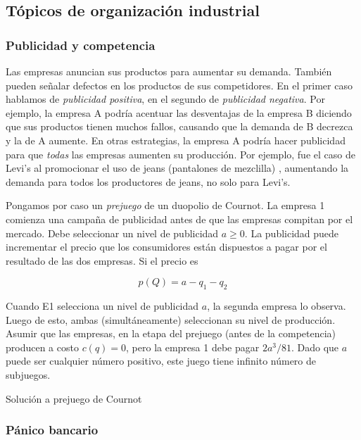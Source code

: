 \documentclass[12pt]{scrartcl}
\begin{document}
\subsection{Tópicos de organización industrial}

\subsubsection{Publicidad y competencia}

Las empresas anuncian sus productos para aumentar su demanda. También pueden señalar defectos en los productos de sus competidores. En el primer caso hablamos de \textit{publicidad positiva}, en el segundo de \textit{publicidad negativa}. Por ejemplo, la empresa A podría acentuar las desventajas de la empresa B diciendo que sus productos tienen muchos fallos, causando que la demanda de B decrezca y la de A aumente. En otras estrategias, la empresa A podría hacer publicidad para que \textit{todas} las empresas aumenten su producción. Por ejemplo, fue el caso de Levi's al promocionar el uso de jeans (pantalones de mezclilla) , aumentando la demanda para todos los productores de jeans, no solo para Levi's. 

Pongamos por caso un \textit{prejuego} de un duopolio de Cournot. La empresa 1 comienza una campaña de publicidad antes de que las empresas compitan por el mercado. Debe seleccionar un nivel de publicidad $a\geq 0$. La publicidad puede incrementar el precio que los consumidores están dispuestos a pagar por el resultado de las dos empresas. Si el precio es

\[ p(Q) = a - q_1 - q_2 \]

Cuando E1 selecciona un nivel de publicidad $a$, la segunda empresa lo observa. Luego de esto, ambas (simultáneamente) seleccionan su nivel de producción. Asumir que las empresas, en la etapa del prejuego (antes de la competencia) producen a costo $c(q) = 0$, pero la empresa 1 debe pagar $2a^3/81$. Dado que $a$ puede ser cualquier número positivo, este juego tiene infinito número de subjuegos. 

\begin{exbox}{Solución a prejuego de Cournot}
	
	\vspace{6cm}	
	
\end{exbox}

\subsubsection{Pánico bancario}
\end{document}
